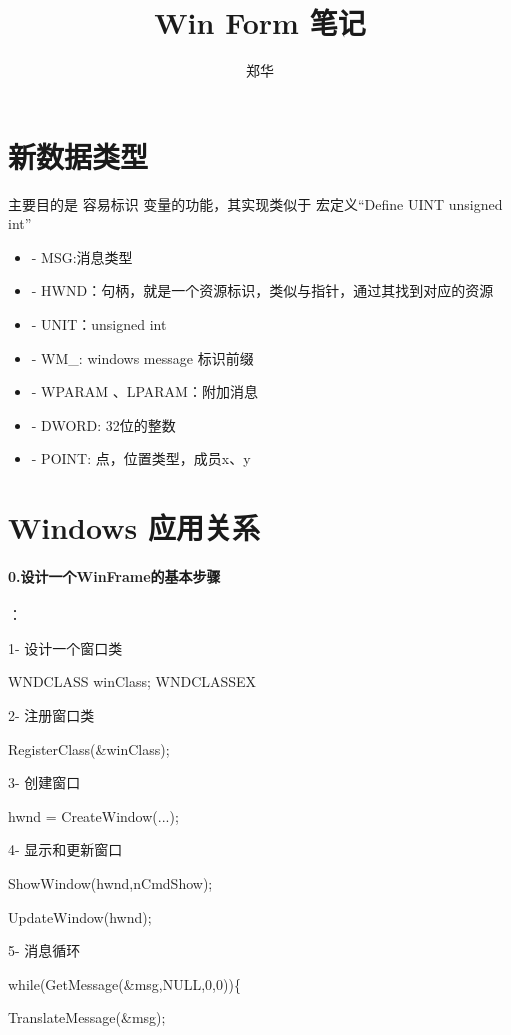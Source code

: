 \documentclass[UTF8,a4paper,8pt]{ctexart}
\author{\kaishu 郑华}
\title{Win Form  笔记}
\begin{document}
	\maketitle

   
\section{新数据类型}主要目的是 容易标识 变量的功能，其实现类似于 宏定义“Define UINT  unsigned int”
     \begin{itemize}
     	\item - MSG:消息类型
     	\item - HWND：句柄，就是一个资源标识，类似与指针，通过其找到对应的资源
     	\item - UNIT：unsigned int
     	\item - WM\_: windows message 标识前缀 
     	\item - WPARAM 、LPARAM：附加消息
     	\item - DWORD: 32位的整数
     	\item - POINT: 点，位置类型，成员x、y
     \end{itemize}  
 	
\section{Windows 应用关系}	 

   	\paragraph {0.设计一个WinFrame的基本步骤}：
   	
		   	1- 设计一个窗口类
		   	
		   	  WNDCLASS  winClass; WNDCLASSEX
		   	  
		   	2- 注册窗口类
		   	
		   	  RegisterClass(\&winClass);
		   	  
		   	3- 创建窗口
		   	
		   	  hwnd = CreateWindow(...);
		   	  
		   	4- 显示和更新窗口
		   	
		   	  ShowWindow(hwnd,nCmdShow);
		 
		   	  UpdateWindow(hwnd);
		   	  
		   	5- 消息循环
		   	
		   	  while(GetMessage(\&msg,NULL,0,0))\{
		   	  	
		   	  	TranslateMessage(\&msg);
		   	  	
\end{document}
